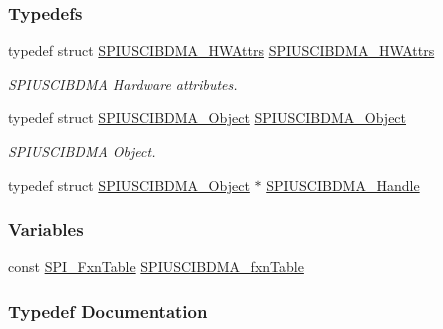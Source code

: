 \subsubsection*{Typedefs}
\begin{DoxyCompactItemize}
\item 
typedef struct \hyperlink{struct_s_p_i_u_s_c_i_b_d_m_a___h_w_attrs}{S\+P\+I\+U\+S\+C\+I\+B\+D\+M\+A\+\_\+\+H\+W\+Attrs} \hyperlink{_s_p_i_u_s_c_i_b_d_m_a_8h_aead599faafac7ef553d430f31c144057}{S\+P\+I\+U\+S\+C\+I\+B\+D\+M\+A\+\_\+\+H\+W\+Attrs}
\begin{DoxyCompactList}\small\item\em S\+P\+I\+U\+S\+C\+I\+B\+D\+M\+A Hardware attributes. \end{DoxyCompactList}\item 
typedef struct \hyperlink{struct_s_p_i_u_s_c_i_b_d_m_a___object}{S\+P\+I\+U\+S\+C\+I\+B\+D\+M\+A\+\_\+\+Object} \hyperlink{_s_p_i_u_s_c_i_b_d_m_a_8h_a0698c405d1ebd4309591999417fce4de}{S\+P\+I\+U\+S\+C\+I\+B\+D\+M\+A\+\_\+\+Object}
\begin{DoxyCompactList}\small\item\em S\+P\+I\+U\+S\+C\+I\+B\+D\+M\+A Object. \end{DoxyCompactList}\item 
typedef struct \hyperlink{struct_s_p_i_u_s_c_i_b_d_m_a___object}{S\+P\+I\+U\+S\+C\+I\+B\+D\+M\+A\+\_\+\+Object} $\ast$ \hyperlink{_s_p_i_u_s_c_i_b_d_m_a_8h_afaf74400e5a3e7620329e3a03d072411}{S\+P\+I\+U\+S\+C\+I\+B\+D\+M\+A\+\_\+\+Handle}
\end{DoxyCompactItemize}
\subsubsection*{Variables}
\begin{DoxyCompactItemize}
\item 
const \hyperlink{struct_s_p_i___fxn_table}{S\+P\+I\+\_\+\+Fxn\+Table} \hyperlink{_s_p_i_u_s_c_i_b_d_m_a_8h_ae7f768c12a88c2ad6e03948ae7dde7fa}{S\+P\+I\+U\+S\+C\+I\+B\+D\+M\+A\+\_\+fxn\+Table}
\end{DoxyCompactItemize}


\subsubsection{Typedef Documentation}
